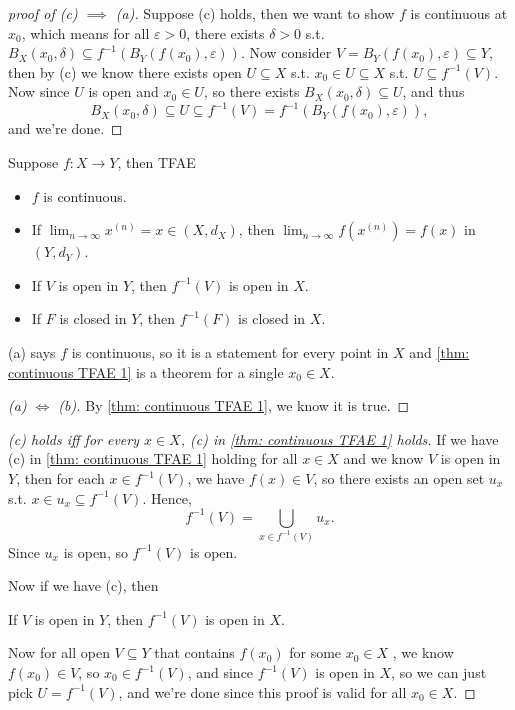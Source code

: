 \begin{proof}[proof of (c) \(\implies \) (a)]
    Suppose (c) holds, then we want to show \(f\) is continuous at \(x_0\), which means for all \(\varepsilon > 0\), there exists \(\delta > 0\) s.t. \(B_X(x_0, \delta ) \subseteq f^{-1} \left( B_Y(f(x_0), \varepsilon ) \right) \). Now consider \(V = B_Y(f(x_0), \varepsilon ) \subseteq Y\), then by (c) we know there exists open \(U \subseteq X\) s.t. \(x_0 \in U \subseteq X\) s.t. \(U \subseteq f^{-1}(V) \). Now since \(U\) is open and \(x_0 \in U\), so there exists \(B_X(x_0, \delta ) \subseteq U\), and thus 
    \[
        B_X(x_0, \delta ) \subseteq U \subseteq f^{-1}(V) = f^{-1} \left( B_Y (f(x_0), \varepsilon ) \right), 
    \] and we're done.
\end{proof}

\begin{theorem} \label{thm: continuous TFAE2}
    Suppose \(f: X \to Y\), then TFAE 
    \begin{itemize}
        \item [(a)] \(f\) is continuous. 
        \item [(b)] If \(\lim_{n \to \infty} x^{(n)} = x \in (X, d_X)\), then \(\lim_{n \to \infty} f \left( x^{(n)} \right) = f(x)  \) in \(\left( Y, d_Y \right) \). 
        \item [(c)] If \(V\) is open in \(Y\), then \(f^{-1}(V)\) is open in \(X\). 
        \item [(d)] If \(F\) is closed in \(Y\), then \(f^{-1}(F)\) is closed in \(X\).         
    \end{itemize}
    \begin{note}
        (a) says \(f\) is continuous, so it is a statement for every point in \(X\) and \autoref{thm: continuous TFAE 1} is a theorem for a single \(x_0 \in X\).    
    \end{note}
\end{theorem}
\begin{proof}[(a) \(\iff \) (b)]
    By \autoref{thm: continuous TFAE 1}, we know it is true. 
\end{proof}
\begin{proof}[(c) holds iff for every \(x \in X\), (c) in \autoref{thm: continuous TFAE 1} holds]
    If we have (c) in \autoref{thm: continuous TFAE 1} holding for all \(x \in X\) and we know \(V\) is open in \(Y\), then for each \(x \in f^{-1}(V)\), we have \(f(x) \in V\), so there exists an open set \(u_x\) s.t. \(x \in u_x \subseteq f^{-1}(V)\). Hence, 
    \[
        f^{-1}(V) = \bigcup_{x \in f^{-1}(V)} u_x .  
    \] Since \(u_x\) is open, so \(f^{-1}(V)\) is open.  
    
    Now if we have (c), then
    \begin{center}
        If \(V\) is open in \(Y\), then \(f^{-1}(V)\) is open in \(X\).    
    \end{center}
    Now for all open \(V \subseteq Y\) that contains \(f(x_0)\) for some \(x_0 \in X\) , we know \(f(x_0) \in V\), so \(x_0 \in f^{-1}(V)\), and since \(f^{-1}(V)\) is open in \(X\), so we can just pick \(U = f^{-1}(V)\), and we're done since this proof is valid for all \(x_0 \in X\).     
\end{proof}
